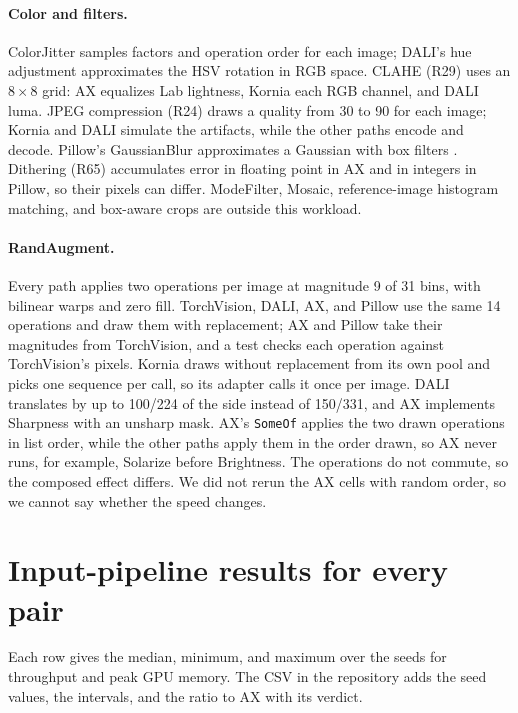 \documentclass[11pt]{article}
\begin{document}
\paragraph{Color and filters.} ColorJitter samples factors and operation order for each image;
DALI's hue adjustment approximates the HSV rotation in RGB space. CLAHE (R29) uses an
\(8\times8\) grid: AX equalizes Lab lightness, Kornia each RGB channel, and DALI luma. JPEG
compression (R24) draws a quality from 30 to 90 for each image; Kornia and DALI simulate the
artifacts, while the other paths encode and decode. Pillow's GaussianBlur approximates a Gaussian
with box filters \cite{pillowfilters}. Dithering (R65) accumulates error in floating point in AX
and in integers in Pillow, so their pixels can differ. ModeFilter, Mosaic, reference-image
histogram matching, and box-aware crops are outside this workload.

\paragraph{RandAugment.} Every path applies two operations per image at magnitude 9 of 31 bins,
with bilinear warps and zero fill. TorchVision, DALI, AX, and Pillow use the same 14 operations
and draw them with replacement; AX and Pillow take their magnitudes from TorchVision, and a test
checks each operation against TorchVision's pixels. Kornia draws without replacement from its own
pool and picks one sequence per call, so its adapter calls it once per image. DALI translates by
up to 100/224 of the side instead of 150/331, and AX implements Sharpness with an unsharp mask.
AX's \texttt{SomeOf} applies the two drawn operations in list order, while the other paths apply them in
the order drawn, so AX never runs, for example, Solarize before Brightness. The operations do not commute,
so the composed effect differs. We did not rerun the AX cells with random order, so we cannot say
whether the speed changes.

\clearpage
\section{Input-pipeline results for every pair}
\label{app:results}

Each row gives the median, minimum, and maximum over the \SeedCount{} seeds for throughput and
peak GPU memory. The CSV in the repository adds the seed values, the intervals, and the ratio to
AX with its verdict.

\begingroup\small
{}

\endgroup
\end{document}
